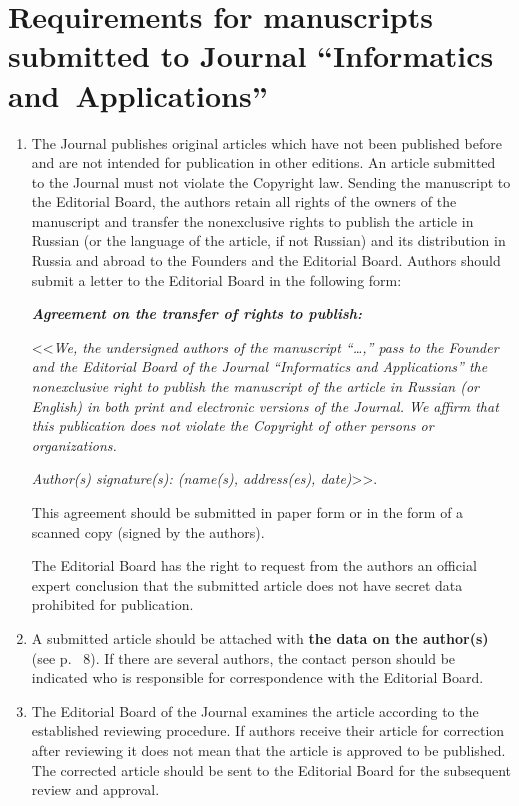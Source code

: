 \vspace*{-60pt} %
{ %
\section*{Requirements for manuscripts submitted to Journal ``Informatics and~Applications''}

\thispagestyle{empty}



\noindent
\begin{enumerate}[1.]
\item The Journal publishes original articles which have not been published before and are not 
intended for publication in other editions. An article submitted to the Journal must not violate 
the Copyright law. Sending the manuscript to the Editorial Board, the authors retain all rights 
of the owners of the manuscript and transfer the nonexclusive rights to publish the article in Russian 
(or the language of the article, if not Russian) and its distribution in Russia and abroad to the Founders 
and the Editorial Board. Authors should submit a letter to the Editorial Board in the following form:


{\bfseries\textit{Agreement on the transfer of rights to publish:}}

<<\textit{We, the undersigned authors of the manuscript ``\ldots,'' pass to the 
Founder and the Editorial Board of the Journal ``Informatics and Applications'' 
the nonexclusive right to publish the manuscript of the article in Russian (or English) 
 in both print and electronic versions of the Journal. We affirm that 
this publication does not violate the Copyright of other persons or organizations. }
 
\textit{Author(s) signature(s): (name(s), address(es), date)}>>.  
 
This agreement should be submitted in paper form or in the form of a scanned copy (signed by the authors). 

The Editorial Board has the right to request from the authors an official expert conclusion 
that the submitted article does not have secret data prohibited for publication. 


\item A submitted article should be attached with \textbf{the data on the author(s)} (see p.~ 8). 
If there are several authors, the contact person should be indicated who is responsible 
for correspondence with the Editorial Board. 

\item The Editorial Board of the Journal examines the article according to the established reviewing procedure. 
If authors receive their article for correction after reviewing it does not mean that the article is approved 
to be published. The corrected article should be sent to the Editorial Board for the subsequent review and approval.


\end{enumerate}}
